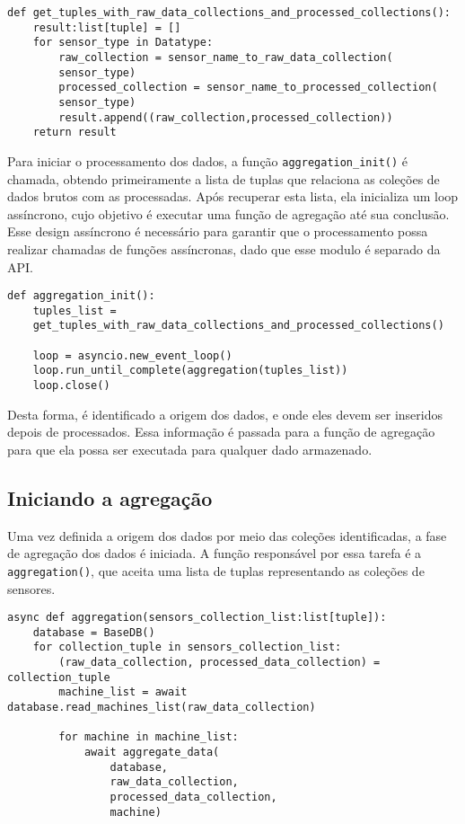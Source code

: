 \begin{verbatim}
def get_tuples_with_raw_data_collections_and_processed_collections():
    result:list[tuple] = []
    for sensor_type in Datatype:
        raw_collection = sensor_name_to_raw_data_collection(
        sensor_type)
        processed_collection = sensor_name_to_processed_collection(
        sensor_type)
        result.append((raw_collection,processed_collection))
    return result
\end{verbatim}

Para iniciar o processamento dos dados, a função \texttt{aggregation\_init()} é chamada, obtendo primeiramente a lista de tuplas que relaciona as coleções de dados brutos com as processadas. Após recuperar esta lista, ela inicializa um loop assíncrono, cujo objetivo é executar uma função de agregação até sua conclusão. Esse design assíncrono é necessário para garantir que o processamento possa realizar chamadas de funções assíncronas, dado que esse modulo é separado da \gls{API}.

\begin{verbatim}
def aggregation_init():
    tuples_list = 
    get_tuples_with_raw_data_collections_and_processed_collections()

    loop = asyncio.new_event_loop()
    loop.run_until_complete(aggregation(tuples_list))
    loop.close()
\end{verbatim}

Desta forma, é identificado a origem dos dados, e onde eles devem ser inseridos depois de processados. Essa informação é passada para a função de agregação para que ela possa ser executada para qualquer dado armazenado.

\subsection{Iniciando a agregação}
Uma vez definida a origem dos dados por meio das coleções identificadas, a fase de agregação dos dados é iniciada. A função responsável por essa tarefa é a \texttt{aggregation()}, que aceita uma lista de tuplas representando as coleções de sensores.

\begin{verbatim}
async def aggregation(sensors_collection_list:list[tuple]):
    database = BaseDB()
    for collection_tuple in sensors_collection_list:
        (raw_data_collection, processed_data_collection) = collection_tuple
        machine_list = await database.read_machines_list(raw_data_collection)

        for machine in machine_list:
            await aggregate_data(
                database,
                raw_data_collection,
                processed_data_collection,
                machine)
\end{verbatim}

